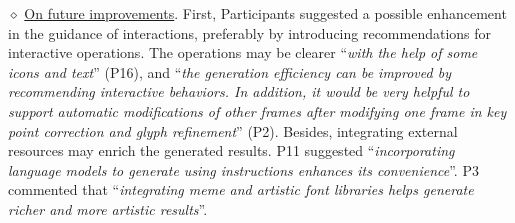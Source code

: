 $\diamond$ \underline{On future improvements}. 
First, Participants suggested a possible enhancement in the guidance of interactions, preferably by introducing recommendations for interactive operations. 
The operations may be clearer ``{\it with the help of some icons and text}'' (P16), and ``{\it the generation efficiency can be improved by recommending interactive behaviors. In addition, it would be very helpful to support automatic modifications of other frames after modifying one frame in key point correction and glyph refinement}'' (P2).
Besides, integrating external resources may enrich the generated results.
P11 suggested ``{\it incorporating language models to generate using instructions enhances its convenience}''.
P3 commented that ``{\it integrating meme and artistic font libraries helps generate richer and more artistic results}''.



